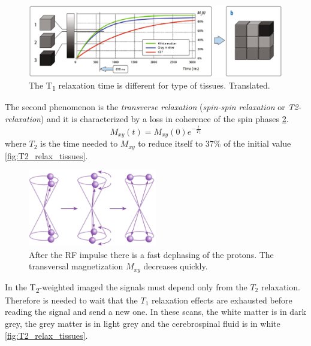  \begin{figure}[h]
    \centering
    \includegraphics[width=1\textwidth]{images/t1_relax_tissues.png}
    \caption{The T\textsubscript{1} relaxation time is different for type of tissues. \cite{elementiRisonanza} Translated.}
    \label{fig:T1_relax_tissues}
 \end{figure}
 The second phenomenon is the \emph{transverse relaxation} (\emph{spin-spin relaxation} or \emph{T2-relaxation}) and it is characterized by a loss in coherence of the spin phases \ref{fig:T2_relax_phases}.
 \begin{equation}
    M_{xy}(t)=M_{xy}(0)e^{-\frac{t}{T_{2}}}
 \end{equation}
 where $T_2$ is the time needed to $M_{xy}$ to reduce itself to $37\%$ of the initial value \ref{fig:T2_relax_tissues}.

 \begin{figure}[h]
   \centering
   \includegraphics[width=0.5\textwidth]{images/t2_relax_phases.png}
   \caption{After the RF impulse there is a fast dephasing of the protons. The transversal magnetization $M_{xy}$ decreases quickly. \cite{KastlerVetterIRM} }
   \label{fig:T2_relax_phases}
\end{figure}
 
 In the T\textsubscript{2}-weighted imaged the signals must depend only from the $T_2$ relaxation. Therefore is needed to wait that the $T_1$ relaxation effects are exhausted before reading the signal and send a new one. In these scans, the white matter is in dark grey, the grey matter is in light grey and the cerebrospinal fluid is in white \ref{fig:T2_relax_tissues}.

